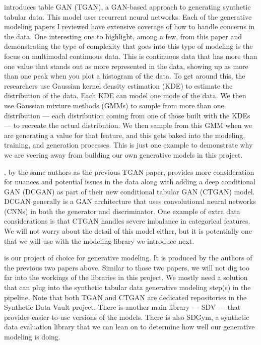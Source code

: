 \documentclass[sigconf, authorversion, nonacm]{acmart}
\begin{document}
    \cite{DBLP:journals/corr/abs-1811-11264} introduces table GAN (TGAN), a GAN-based approach to generating synthetic tabular data. This model uses recurrent neural networks. Each of the generative modeling papers I reviewed have extensive coverage of how to handle concerns in the data. One interesting one to highlight, among a few, from this paper and demonstrating the type of complexity that goes into this type of modeling is the focus on multimodal continuous data. This is continuous data that has more than one value that stands out as more represented in the data, showing up as more than one peak when you plot a histogram of the data. To get around this, the researchers use Gaussian kernel density estimation (KDE) to estimate the distribution of the data. Each KDE can model one mode of the data. We then use Gaussian mixture methods (GMMs) to sample from more than one distribution --- each distribution coming from one of those built with the KDEs --- to recreate the actual distribution. We then sample from this GMM when we are generating a value for that feature, and this gets baked into the modeling, training, and generation processes. This is just one example to demonstrate why we are veering away from building our own generative models in this project.

    \cite{DBLP:journals/corr/abs-1907-00503}, by the same authors as the previous TGAN paper, provides more consideration for nuances and potential issues in the data along with adding a deep conditional GAN (DCGAN) as part of their new conditional tabular GAN (CTGAN) model. DCGAN generally is a GAN architecture that uses convolutional neural networks (CNNs) in both the generator and discriminator. One example of extra data considerations is that CTGAN handles severe imbalance in categorical features. We will not worry about the detail of this model either, but it is potentially one that we will use with the modeling library we introduce next.

    \cite{sdv} is our project of choice for generative modeling. It is produced by the authors of the previous two papers above. Similar to those two papers, we will not dig too far into the workings of the libraries in this project. We mostly need a solution that can plug into the synthetic tabular data generative modeling step(s) in the pipeline. Note that both TGAN and CTGAN are dedicated repositories in the Synthetic Data Vault project. There is another main library --- SDV --- that provides easier-to-use versions of the models. There is also SDGym, a synthetic data evaluation library that we can lean on to determine how well our generative modeling is doing.
\end{document}
